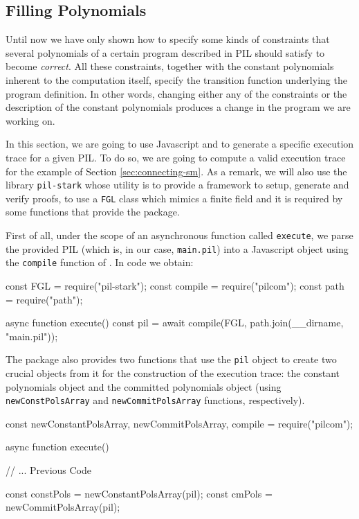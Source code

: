 \subsection{Filling Polynomials}

Until now we have only shown how to specify some kinds of constraints that several polynomials of a certain program described in PIL should satisfy to become \textit{correct}. All these constraints, together with the constant polynomials inherent to the computation itself, specify the transition function underlying the program definition. In other words, changing either any of the constraints or the description of the constant polynomials produces a change in the program we are working on. 

In this section, we are going to use Javascript and \pilcom to generate a specific execution trace for a given PIL. To do so, we are going to compute a valid execution trace for the example of Section \ref{sec:connecting-sm}. As a remark, we will also use the library \texttt{pil-stark} whose utility is to provide a framework to setup, generate and verify proofs, to use a \texttt{FGL} class which mimics a finite field and it is required by some functions that provide the \pilcom package. 

First of all, under the scope of an asynchronous function called \texttt{execute}, we parse the provided PIL (which is, in our case, \texttt{main.pil}) into a Javascript object using the \texttt{compile} function of \pilcom. In code we obtain:
\begin{js}
    const { FGL } = require("pil-stark");
    const { compile } = require("pilcom");
    const path = require("path");
    
    async function execute() {
        const pil = await compile(FGL, path.join(__dirname, "main.pil"));
    }
\end{js}

The \pilcom package also provides two functions that use the \texttt{pil} object to create two crucial objects from it for the construction of the execution trace: the constant polynomials object and the committed polynomials object (using \texttt{newConstPolsArray} and \texttt{newCommitPolsArray} functions, respectively).
\begin{js}
    const { newConstantPolsArray, newCommitPolsArray, compile } = require("pilcom");
    
    async function execute() {
        
        // ... Previous Code
        
        const constPols =  newConstantPolsArray(pil);
        const cmPols = newCommitPolsArray(pil);
    }
\end{js}

